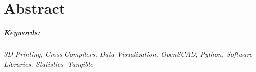 

\begingroup
\let\clearpage\relax
\let\cleardoublepage\relax
\let\cleardoublepage\relax

\chapter*{Abstract} %

\lipsum[1-2]

\endgroup			

\paragraph{Keywords:} \textit{3D Printing, Cross Compilers, Data Visualization,
OpenSCAD, Python, Software Libraries, Statistics, Tangible}

\vfill
